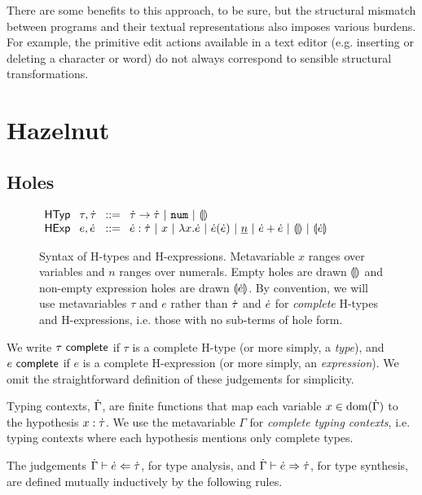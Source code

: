 \documentclass{llncs}
\begin{document}
There are some benefits to this approach, to be sure, but the structural mismatch between programs and their textual representations  also imposes various burdens.
For example, the primitive edit actions available in a text editor (e.g. inserting or deleting a character or word)  do not always correspond to  sensible structural transformations.




\section{Hazelnut}
\subsection{Holes}
\begin{figure}
$\arraycolsep=4pt\begin{array}{lllllll}
\mathsf{HTyp} & \tau,\htau & ::= &
  \tarr{\htau}{\htau} ~\vert~
  \tnum ~\vert~
  \tehole\\
\mathsf{HExp} & e,\hexp & ::= &
  \hexp : \htau ~\vert~
  x ~\vert~
  \hlam{x}{\hexp} ~\vert~
  \hap{\hexp}{\hexp} ~\vert~
  \hnum{n} ~\vert~
  \hadd{\hexp}{\hexp} ~\vert~
  \hehole ~\vert~
  \hhole{\hexp}
\end{array}$
\caption{Syntax of H-types and H-expressions. Metavariable $x$ ranges over variables and $n$ ranges over numerals. Empty holes are drawn $\llparenthesis\rrparenthesis$ and non-empty expression holes are drawn $\llparenthesis\dot{e}\rrparenthesis$. By convention, we will use metavariables $\tau$ and $e$ rather than $\dot{\tau}$ and $\dot{e}$ for \emph{complete} H-types and H-expressions, i.e. those with no sub-terms of hole form.}
\label{fig:hexp-syntax}
\end{figure}

We write $\tau~\mathsf{complete}$ if $\tau$ is a complete H-type (or more simply, a \emph{type}), and $e~\mathsf{complete}$ if $e$ is a complete H-expression (or more simply, an \emph{expression}). We omit the straightforward definition of these judgements for simplicity.

Typing contexts, $\dot{\Gamma}$, are finite functions that map each variable $x \in \text{dom}(\dot{\Gamma})$ to the hypothesis $x : \dot{\tau}$. We use the metavariable $\Gamma$ for \emph{complete typing contexts}, i.e. typing contexts where each hypothesis mentions only complete types.

The judgements $\dot{\Gamma} \vdash \dot{e} \Leftarrow \dot{\tau}$, for type analysis, and $\dot{\Gamma} \vdash \dot{e} \Rightarrow \dot{\tau}$, for type synthesis, are defined mutually inductively by the following rules.
\end{document}
